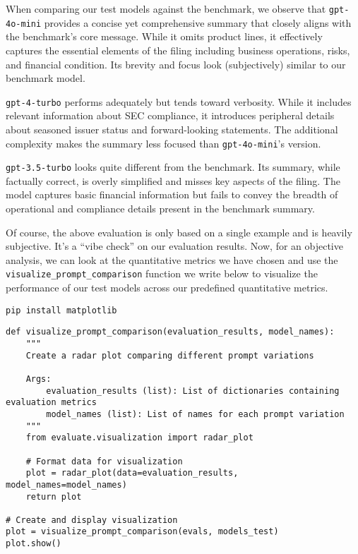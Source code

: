 When comparing our test models against the benchmark, we observe that \texttt{gpt-4o-mini} provides a concise yet comprehensive summary that closely aligns with the benchmark's core message. While it omits product lines, it effectively captures the essential elements of the filing including business operations, risks, and financial condition. Its brevity and focus look (subjectively) similar to our benchmark model.

\texttt{gpt-4-turbo} performs adequately but tends toward verbosity. While it includes relevant information about SEC compliance, it introduces peripheral details about seasoned issuer status and forward-looking statements. The additional complexity makes the summary less focused than \texttt{gpt-4o-mini}'s version.

\texttt{gpt-3.5-turbo} looks quite different from the benchmark. Its summary, while factually correct, is overly simplified and misses key aspects of the filing. The model captures basic financial information but fails to convey the breadth of operational and compliance details present in the benchmark summary.

Of course, the above evaluation is only based on a single example and is heavily subjective. It's a ``vibe check'' on our evaluation results. Now, for an objective analysis, we can look at the quantitative metrics we have chosen and use the \texttt{visualize\_prompt\_comparison} function we write below to visualize the performance of our test models across our predefined quantitative metrics.

\begin{verbatim}
pip install matplotlib
\end{verbatim}

\begin{verbatim}
def visualize_prompt_comparison(evaluation_results, model_names):
    """
    Create a radar plot comparing different prompt variations
    
    Args:
        evaluation_results (list): List of dictionaries containing evaluation metrics
        model_names (list): List of names for each prompt variation
    """
    from evaluate.visualization import radar_plot
    
    # Format data for visualization
    plot = radar_plot(data=evaluation_results, model_names=model_names)
    return plot

# Create and display visualization
plot = visualize_prompt_comparison(evals, models_test)
plot.show()
\end{verbatim}


